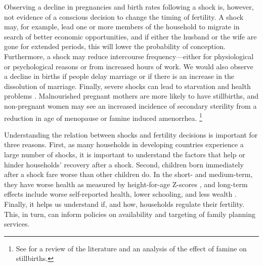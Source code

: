 \documentclass[letterpaper,12pt]{article}
\begin{document}
Observing a decline in pregnancies and birth rates following a shock is, however, 
not evidence of a conscious decision to change the timing of fertility.
A shock may, for example, lead one or more members of the household to 
migrate in search of better economic opportunities, and if either the husband 
or the wife are gone for extended periods, this will lower the probability of 
conception.
Furthermore, a shock may reduce intercourse frequency---either for
physiological or psychological reasons or from increased hours of work.
We would also observe a decline in births if people delay marriage or 
if there is an increase in the dissolution of marriage.
Finally, severe shocks can lead to starvation and health problems \citep{lindstrom99}.
Malnourished pregnant mothers are more likely to have stillbirths,
and non-pregnant women may see an increased incidence of secondary sterility
from a reduction in age of menopause or famine induced amenorrhea.%
\footnote{
See \cite{Hernandez-Julian2014} for a review of the literature and an 
analysis of the effect of famine on stillbirths.
}

Understanding the relation between shocks and fertility decisions is important for
three reasons.
First, as many households in developing countries experience a large number of shocks, 
it is important to understand the factors that help or hinder households' recovery 
after a shock.
Second, children born immediately after a shock fare worse than other children do.
In the short- and medium-term, they have worse health as measured by height-for-age 
Z-scores \citep{Portner2010}, and
long-term effects include worse self-reported health, lower schooling, and less
wealth \citep{Maccini2009}.
Finally, it helps us understand if, and how, households regulate their fertility.
This, in turn, can inform policies on availability and targeting
of family planning services.
\end{document}
